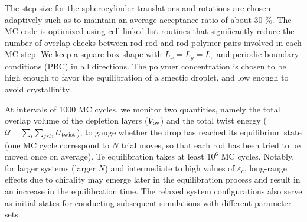 The step size for the spherocylinder translations and rotations are chosen adaptively such as to maintain an average acceptance ratio of about 30 \%. The MC code is optimized using cell-linked list routines that significantly reduce the number of overlap checks between rod-rod and rod-polymer pairs involved in each MC step. We keep a square box shape with $L_{x} = L_{y} =L_{z}$ and periodic boundary conditions (PBC) in all directions. The polymer concentration is chosen to be high enough to favor the equilibration of a smectic droplet, and low enough to avoid crystallinity.

At intervals of 1000 MC cycles, we monitor two quantities, namely the total overlap volume of the depletion layers ($V_{\rm ov}$) and the total twist energy ($\mathcal{U} = \sum_{i}\sum_{j<i}U_{\rm twist}$), to gauge whether the drop has reached its equilibrium state (one MC cycle correspond to $N$ trial moves, so that each rod has been tried to be moved once on average). Te equilibration takes at least $10^6$ MC cycles. Notably, for larger systems (larger $N$) and intermediate to high values of $\varepsilon_c$, long-range effects due to chirality may emerge later in the equilibration process and result in an increase in the equilibration time. The relaxed system configurations also serve as initial states for conducting subsequent simulations with different parameter sets.

